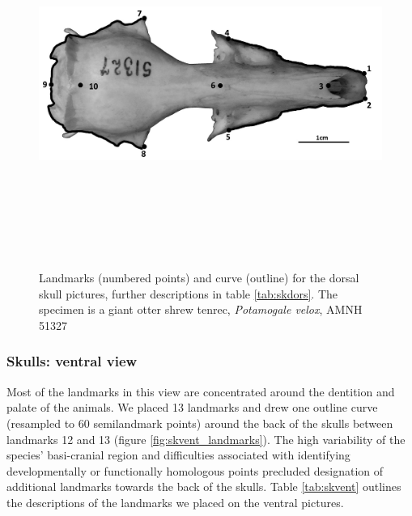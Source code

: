 \documentclass[12pt,a4paper]{article}
\begin{document}
	\begin{figure}[!htb] 
 	\centering
  	\includegraphics[width=12cm, height=12cm, keepaspectratio=true]
  	{figures/SkDors_BW_crop.jpg}    
    \caption {Landmarks (numbered points) and curve (outline) for the dorsal skull pictures, further descriptions in table \ref{tab:skdors}. The specimen is a giant otter shrew tenrec, \textit{Potamogale velox}, AMNH 51327}
  	\label{fig:skdors_landmarks}
  	\end{figure}

	\begin{table}[!htb]			
	\centering
	\caption{Descriptions of the landmarks (points) and curves (semilandmarks) for the skulls in dorsal view (see Figure \ref{fig:skdors_landmarks}).}
	 
	\label{tab:skdors}  
	\end{table}

\newpage
\subsubsection{Skulls: ventral view}
	Most of the landmarks in this view are concentrated around the dentition and palate of the animals. We placed 13 landmarks and drew one outline curve (resampled to 60 semilandmark points) around the back of the skulls between landmarks 12 and 13 (figure \ref{fig:skvent_landmarks}). The high variability of the species' basi-cranial region and difficulties associated with identifying developmentally or functionally homologous points precluded designation of additional landmarks towards the back of the skulls. Table \ref{tab:skvent} outlines the descriptions of the landmarks we placed on the ventral pictures.
\end{document}
